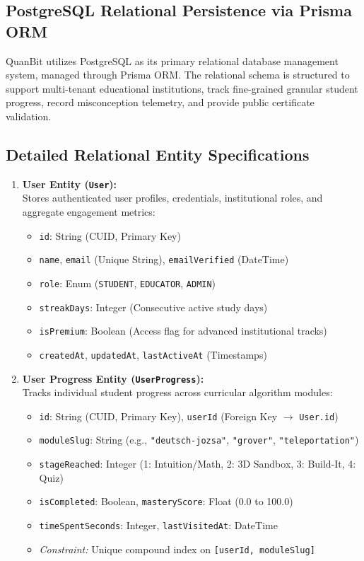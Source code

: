 \documentclass[11pt, a4paper]{article}
\begin{document}
\subsection{PostgreSQL Relational Persistence via Prisma ORM}
QuanBit utilizes PostgreSQL as its primary relational database management system, managed through Prisma ORM. The relational schema is structured to support multi-tenant educational institutions, track fine-grained granular student progress, record misconception telemetry, and provide public certificate validation.

\subsection{Detailed Relational Entity Specifications}
\begin{enumerate}[label=\textbf{\arabic*.}, itemsep=4pt, parsep=2pt]
	\item \textbf{User Entity (\texttt{User}):}\\
	Stores authenticated user profiles, credentials, institutional roles, and aggregate engagement metrics:
	\begin{itemize}[noitemsep, topsep=2pt]
		\item \texttt{id}: String (CUID, Primary Key)
		\item \texttt{name}, \texttt{email} (Unique String), \texttt{emailVerified} (DateTime)
		\item \texttt{role}: Enum (\texttt{STUDENT}, \texttt{EDUCATOR}, \texttt{ADMIN})
		\item \texttt{streakDays}: Integer (Consecutive active study days)
		\item \texttt{isPremium}: Boolean (Access flag for advanced institutional tracks)
		\item \texttt{createdAt}, \texttt{updatedAt}, \texttt{lastActiveAt} (Timestamps)
	\end{itemize}

	\item \textbf{User Progress Entity (\texttt{UserProgress}):}\\
	Tracks individual student progress across curricular algorithm modules:
	\begin{itemize}[noitemsep, topsep=2pt]
		\item \texttt{id}: String (CUID, Primary Key), \texttt{userId} (Foreign Key $\to$ \texttt{User.id})
		\item \texttt{moduleSlug}: String (e.g., \texttt{"deutsch-jozsa"}, \texttt{"grover"}, \texttt{"teleportation"})
		\item \texttt{stageReached}: Integer (1: Intuition/Math, 2: 3D Sandbox, 3: Build-It, 4: Quiz)
		\item \texttt{isCompleted}: Boolean, \texttt{masteryScore}: Float (0.0 to 100.0)
		\item \texttt{timeSpentSeconds}: Integer, \texttt{lastVisitedAt}: DateTime
		\item \textit{Constraint:} Unique compound index on \texttt{[userId, moduleSlug]}
	\end{itemize}


\end{enumerate}
\end{document}
